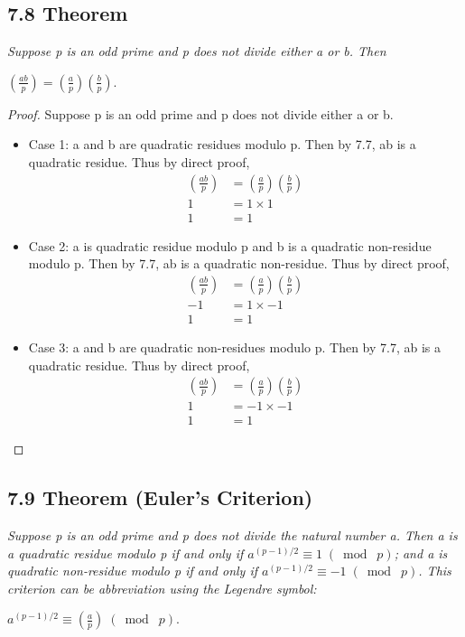 \documentclass{article}
\begin{document}
\subsection*{7.8 Theorem} 
\quad \textit{Suppose p is an odd prime and p does not divide either a or b. Then}
\begin{center}
    $(\frac{ab}{p}) = (\frac{a}{p})(\frac{b}{p})$.
\end{center}

\begin{proof}
Suppose p is an odd prime and p does not divide either a or b.
\begin{itemize}
    \item Case 1: a and b are quadratic residues modulo p. Then by 7.7, ab is a quadratic residue. Thus by direct proof,
    \begin{align*}
        && (\frac{ab}{p}) &= (\frac{a}{p})(\frac{b}{p}) &&\\
        && 1 &= 1 \times 1 &&\\
        && 1 &= 1 &&
    \end{align*}
    \item Case 2: a is quadratic residue modulo p and b is a quadratic non-residue modulo p. Then by 7.7, ab is a quadratic non-residue. Thus by direct proof,
    \begin{align*}
        && (\frac{ab}{p}) &= (\frac{a}{p})(\frac{b}{p}) &&\\
        && -1 &= 1 \times -1 &&\\
        && 1 &= 1 &&
    \end{align*}
    \item Case 3: a and b are quadratic non-residues modulo p. Then by 7.7, ab is a quadratic residue. Thus by direct proof,
    \begin{align*}
        && (\frac{ab}{p}) &= (\frac{a}{p})(\frac{b}{p}) &&\\
        && 1 &= -1 \times -1 &&\\
        && 1 &= 1 &&
    \end{align*}
\end{itemize}
\end{proof}



\subsection*{7.9 Theorem (Euler's Criterion)} 
\quad \textit{Suppose p is an odd prime and p does not divide the natural number a. Then a is a quadratic residue modulo p if and only if $a^{(p-1)/2} \equiv 1 \;(\bmod\; p)$; and a is quadratic non-residue modulo p if and only if $a^{(p-1)/2} \equiv -1 \;(\bmod\; p)$. This criterion can be abbreviation using the Legendre symbol:}
\begin{center}
    $a^{(p-1)/2} \equiv (\frac{a}{p}) \;(\bmod\; p)$.
\end{center}
\end{document}
